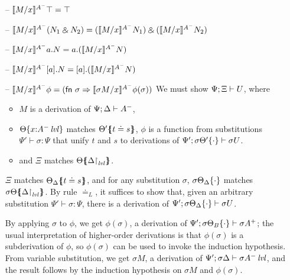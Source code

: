 \begin{itemize}
\smallskip

\item[--] $\rsubsta{M}{x}{\ttopr}{A^-} 
           = \ttopr$
\item[--] $\rsubsta{M}{x}{(\twithr{N_1}{N_2})}{A^-} 
           = \twithr{(\rsubsta{M}{x}{N_1}{A^-})}{(\rsubsta{M}{x}{N_2}{A^-})}$

\item[--] $\rsubsta{M}{x}{\texistsl{a}{N}}{A^-} 
           = \texistsl{a}{(\rsubsta{M}{x}{N}{A^-})}$
\item[--] $\rsubsta{M}{x}{\tforallr{a}{N}}{A^-} 
           = \tforallr{a}{(\rsubsta{M}{x}{N}{A^-})}$
\item[--] $\rsubsta{M}{x}{\phi}{A^-} 
           = ({\sf fn}~\sigma \Rightarrow 
              \rsubsta{\sigma{M}}{x}{\phi(\sigma)}{A^-})$
  We must show $\foc{\Psi}{\Xi}{U}$, where
  \begin{itemize}
  \item $M$ is a derivation of $\foc{\Psi}{\Delta}{A^-}$, 
  \item $\tackon{\Theta}{x{:}\islvl{A^-}}$ matches 
     $\frameoff{\Theta'}{t \doteq s}$, $\phi$ 
     is a function from substitutions $\Psi' \vdash \sigma : \Psi$
     that unify $t$ and $s$ to derivations of 
     $\foc{\Psi'}{\tackon{\sigma\Theta'}{\cdot}}{\sigma{U}}$.
  \item and $\Xi$ matches $\frameoff{\Theta}{\restrictto{\Delta}{\mlvl}}$.
  \end{itemize}

  $\Xi$ matches $\frameoff{\Theta_\Delta}{t \doteq s}$, and 
  for any substitution $\sigma$, $\tackon{\sigma\Theta_\Delta}{\cdot}$
  matches $\frameoff{\sigma\Theta}{\restrictto{\Delta}{\mlvl}}$.
  By rule $\doteq_L$, it suffices to show that, given an arbitrary
  substitution $\Psi' \vdash \sigma : \Psi$, there
  is a derivation of 
  $\foc{\Psi'}{\tackon{\sigma\Theta_\Delta}{\cdot}}{\sigma{U}}$.

  By applying $\sigma$ to $\phi$, we get $\phi(\sigma)$, a derivation 
  of $\foc{\Psi'}{\tackon{\sigma\Theta_B}{\cdot}}{\sigma{A^+}}$;
  the usual interpretation of higher-order derivations is that 
  $\phi(\sigma)$ is a subderivation of $\phi$, so $\phi(\sigma)$ can be
  used to invoke the induction hypothesis.
  From variable substitution, we get $\sigma{M}$, a derivation
  of 
  $\foc{\Psi'}{\sigma\Delta}{\islvl{\sigma{A^-}}}$,
  and the result follows
  by the induction hypothesis on $\sigma{M}$ and 
  $\phi(\sigma)$.

\end{itemize}

